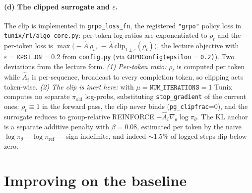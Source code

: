 \documentclass[11pt,a4paper]{article}
\begin{document}
\paragraph{(d) The clipped surrogate and $\varepsilon$.}
The clip is implemented in \texttt{grpo\_loss\_fn}, the registered \texttt{"grpo"}
policy loss in \texttt{tunix/rl/algo\_core.py}: per-token log-ratios are exponentiated to
$\rho_t$ and the per-token loss is
$\max\bigl(-\hat A\,\rho_t,\,-\hat A\,\mathrm{clip}_{1\pm\varepsilon}(\rho_t)\bigr)$,
the lecture objective with $\varepsilon=\texttt{EPSILON}=0.2$ from \texttt{config.py} (via
\texttt{GRPOConfig(epsilon$=$0.2)}). Two deviations from the lecture form. \emph{(1)
Per-token ratio:} $\rho_t$ is computed per token while $\hat A_i$ is per-sequence, broadcast
to every completion token, so clipping acts token-wise. \emph{(2) The clip is inert here:}
with $\mu=\texttt{NUM\_ITERATIONS}=1$ Tunix computes no separate $\pi_{\mathrm{old}}$
log-probs, substituting \texttt{stop\_gradient} of the current ones: $\rho_t\equiv1$ in
the forward pass, the clip never binds (\texttt{pg\_clipfrac}{=}0), and the surrogate
reduces to group-relative REINFORCE $-\hat A_i\nabla_\theta\log\pi_\theta$. The KL anchor is a separate additive penalty with $\beta=0.08$, estimated per token by
the naive $\log\pi_\theta-\log\pi_{\mathrm{ref}}$ \citep{schulman2020kl} ---
sign-indefinite, and indeed ${\sim}1.5\%$ of logged steps dip below zero.

\section{Improving on the baseline}
\label{sec:improve}

\end{document}
